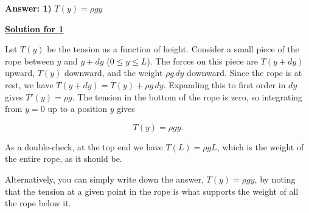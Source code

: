\textbf{Answer: 1)} $T(y) = \rho g y$

\underline{\textbf{Solution for 1}}

Let $T(y)$ be the tension as a function of height. Consider a small piece of the rope between $y$ and $y+dy$ ($0 \le y \le L$). The forces on this piece are $T(y+dy)$ upward, $T(y)$ downward, and the weight $\rho g\, dy$ downward. Since the rope is at rest, we have $T(y+dy) = T(y) + \rho g\, dy$. Expanding this to first order in $dy$ gives $T'(y) = \rho g$. The tension in the bottom of the rope is zero, so integrating from $y = 0$ up to a position $y$ gives

\begin{equation} T(y) = \rho g y. \tag{2.16} \end{equation}

As a double-check, at the top end we have $T(L) = \rho g L$, which is the weight of the entire rope, as it should be.

Alternatively, you can simply write down the answer, $T(y) = \rho g y$, by noting that the tension at a given point in the rope is what supports the weight of all the rope below it.